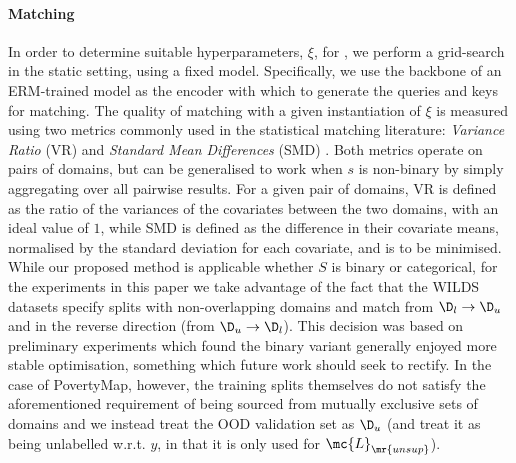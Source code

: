 \paragraph{Matching}\label{matching_imp} In order to determine suitable hyperparameters, $\xi$, for
\CNN, we perform a grid-search in the static setting, using a fixed model. Specifically, we use the
backbone of an ERM-trained model as the encoder with which to generate the queries and keys for
matching.
%
The quality of matching with a given instantiation of $\xi$ is measured using two metrics commonly
used in the statistical matching literature: \emph{Variance Ratio} (VR) and \emph{Standard Mean
Differences} (SMD) \citep{rubin2001using}. 
%
Both metrics operate on pairs of domains, but can be generalised to work when $s$ is
non-binary by simply aggregating over all pairwise results.
%
For a given pair of domains, VR is defined as the ratio of the variances of the covariates between
the two domains, with an ideal value of $1$, while SMD is defined as the difference in their
covariate means, normalised by the standard deviation for each covariate, and is to be minimised.
%
While our proposed method is applicable whether $S$ is binary or categorical, for the experiments
in this paper we take advantage of the fact that the WILDS datasets specify splits with
non-overlapping domains and match from $\D_l \rightarrow \D_u$ and in the reverse direction (from
$\D_u \rightarrow \D_l$). This decision was based on preliminary experiments which found the binary
variant generally enjoyed more stable optimisation, something which future work should seek to
rectify.
%
In the case of PovertyMap, however, the training splits themselves do not satisfy the
aforementioned requirement of being sourced from mutually exclusive sets of domains and we instead
treat the OOD validation set as $\D_u$ (and treat it as being unlabelled w.r.t. $y$, in that it is
only used for $\mc{L}_\mr{unsup}$).

